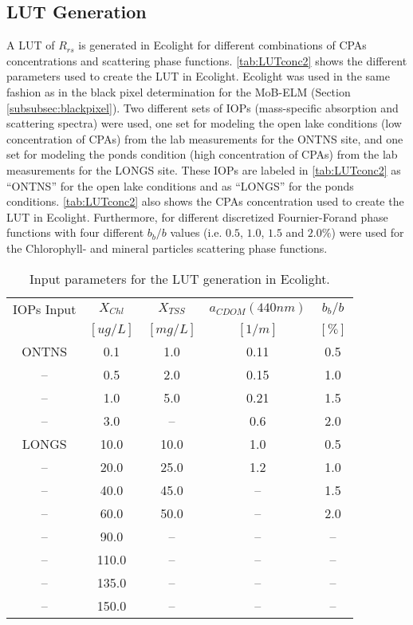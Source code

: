 \documentclass[onecolumn,3p]{elsarticle}
\begin{document}
\subsection{LUT Generation}


A LUT of $R_{rs}$ is generated in Ecolight for different combinations of CPAs concentrations and scattering phase functions. \autoref{tab:LUTconc2} shows the different parameters used to create the LUT in Ecolight. Ecolight was used in the same fashion as in the black pixel determination for the MoB-ELM (Section \ref{subsubsec:blackpixel}). Two different sets of IOPs (mass-specific absorption and scattering spectra) were used, one set for modeling the open lake conditions (low concentration of CPAs) from the lab measurements for the ONTNS site, and one set for modeling the ponds condition (high concentration of CPAs) from the lab measurements for the LONGS site. These IOPs are labeled in \autoref{tab:LUTconc2} as ``ONTNS'' for the open lake conditions and as ``LONGS'' for the ponds conditions. \autoref{tab:LUTconc2} also shows the CPAs concentration used to create the LUT in Ecolight. Furthermore, for different discretized Fournier-Forand phase functions with four different $b_b/b$ values (i.e. $0.5$, $1.0$, $1.5$ and $2.0\%$) were used for the Chlorophyll-{\it} and mineral particles scattering phase functions.


\begin{table}[htb]
\caption{ Input parameters for the LUT generation in Ecolight. \label{tab:LUTconc2} } 
\centering
		\begin{tabular}{c|c|c|c|c}
		\hline
        		IOPs Input & \bfseries{$X_{Chl}$} & \bfseries{$X_{TSS}$} & \bfseries{$a_{CDOM}(440nm)$} & \bfseries{$b_b/b$}   	\\
				           & $[ug/L]$			  & $[mg/L]$ 			 & 	$[1/m]$ 					& $[\%]$		  	  	\\ \hline \hline
ONTNS 	&  0.1  	& 1.0  		&  0.11		&  0.5 	\\
-- 		&  0.5  	& 2.0  		&  0.15		&  1.0 	\\
--    	&  1.0  	& 5.0  		&  0.21		&  1.5 	\\
--    	&  3.0  	& --		&  0.6 		&  2.0 	\\ \hline

LONGS 	&  10.0 	& 10.0		&  1.0 		&  0.5  \\
--    	&  20.0 	& 25.0		&  1.2 		&  1.0  \\
--    	&  40.0 	& 45.0		&  --  		&  1.5  \\
--    	&  60.0 	& 50.0   	&  --  		&  2.0  \\  
--    	&  90.0 	& --   		&  --  		&  --  	\\  
--    	&  110.0	& --   		&  --  		&  --  	\\  
--    	&  135.0	& --   		&  --  		&  --  	\\  
--    	&  150.0	& --   		&  --  		&  --  	\\ \hline 
	 	\end{tabular}
	\end{table}
\end{document}
